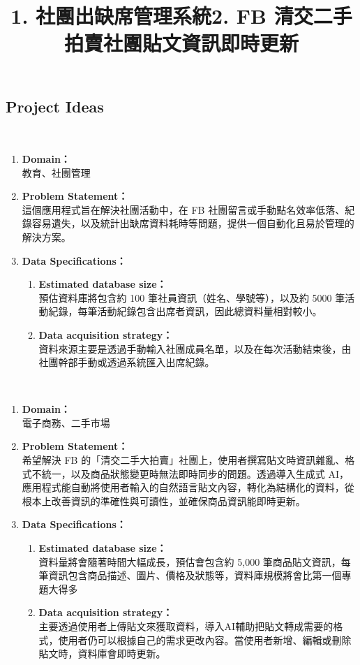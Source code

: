 \subsection{Project Ideas}
\ \\
\title{\bf{1. 社團出缺席管理系統}}
\begin{enumerate}
    \item {\bf{Domain：}} \\教育、社團管理
    \item {\bf{Problem Statement：}} \\這個應用程式旨在解決社團活動中，在 FB 社團留言或手動點名效率低落、紀錄容易遺失，以及統計出缺席資料耗時等問題，提供一個自動化且易於管理的解決方案。
    \item {\bf{Data Specifications：}}
        \begin{enumerate}
            \item {\bf{Estimated database size：}} \\預估資料庫將包含約 100 筆社員資訊（姓名、學號等），以及約 5000 筆活動紀錄，每筆活動紀錄包含出席者資訊，因此總資料量相對較小。
            \item {\bf{Data acquisition strategy：}} \\資料來源主要是透過手動輸入社團成員名單，以及在每次活動結束後，由社團幹部手動或透過系統匯入出席紀錄。
        \end{enumerate}
\end{enumerate}
\ \\
\title{\bf{2. FB 清交二手拍賣社團貼文資訊即時更新}}
\begin{enumerate}
    \item {\bf{Domain：}} \\電子商務、二手市場
    \item {\bf{Problem Statement：}} \\希望解決 FB 的「清交二手大拍賣」社團上，使用者撰寫貼文時資訊雜亂、格式不統一，以及商品狀態變更時無法即時同步的問題。透過導入生成式 AI，應用程式能自動將使用者輸入的自然語言貼文內容，轉化為結構化的資料，從根本上改善資訊的準確性與可讀性，並確保商品資訊能即時更新。\\
    \item {\bf{Data Specifications：}}
        \begin{enumerate}
            \item {\bf{Estimated database size：}} \\資料量將會隨著時間大幅成長，預估會包含約 5,000 筆商品貼文資訊，每筆資訊包含商品描述、圖片、價格及狀態等，資料庫規模將會比第一個專題大得多
            \item {\bf{Data acquisition strategy：}} \\主要透過使用者上傳貼文來獲取資料，導入AI輔助把貼文轉成需要的格式，使用者仍可以根據自己的需求更改內容。當使用者新增、編輯或刪除貼文時，資料庫會即時更新。
        \end{enumerate}
\end{enumerate}
